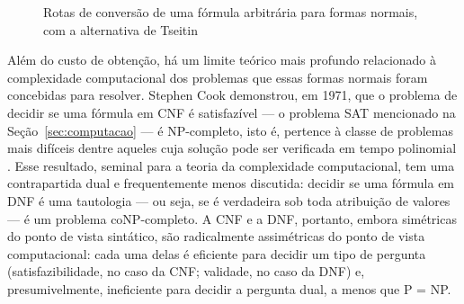 \documentclass[12pt,a4paper,oneside]{report}
\theoremstyle{tituloplain}
\theoremstyle{titulodef}
\begin{document}
\begin{figure}[htbp]
\centering
{}
\caption{Rotas de conversão de uma fórmula arbitrária para formas normais, com a alternativa de Tseitin}
\label{fig:pipeline-conversao}
\end{figure}

Além do custo de obtenção, há um limite teórico mais profundo relacionado à complexidade computacional dos problemas que essas formas normais foram concebidas para resolver. Stephen Cook demonstrou, em 1971, que o problema de decidir se uma fórmula em CNF é satisfazível — o problema SAT mencionado na Seção~\ref{sec:computacao} — é NP-completo, isto é, pertence à classe de problemas mais difíceis dentre aqueles cuja solução pode ser verificada em tempo polinomial \cite{cook1971}. Esse resultado, seminal para a teoria da complexidade computacional, tem uma contrapartida dual e frequentemente menos discutida: decidir se uma fórmula em DNF é uma tautologia — ou seja, se é verdadeira sob toda atribuição de valores — é um problema coNP-completo. A CNF e a DNF, portanto, embora simétricas do ponto de vista sintático, são radicalmente assimétricas do ponto de vista computacional: cada uma delas é eficiente para decidir um tipo de pergunta (satisfazibilidade, no caso da CNF; validade, no caso da DNF) e, presumivelmente, ineficiente para decidir a pergunta dual, a menos que P = NP.
 
\end{document}
